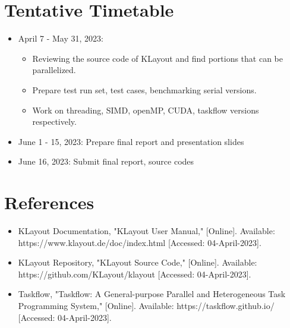 \documentclass[sigconf]{acmart}
\begin{document}
\section{Tentative Timetable}
\begin{itemize}
    \item April 7 - May 31, 2023: 
    \begin{itemize}
      \item Reviewing the source code of KLayout and find portions that can be parallelized.
      \item Prepare test run set, test cases, benchmarking serial versions.
      \item Work on threading, SIMD, openMP, CUDA, taskflow versions respectively.
    \end{itemize}
    \item June 1 - 15, 2023: Prepare final report and presentation slides
    \item June 16, 2023: Submit final report, source codes
\end{itemize}

\section{References}
\begin{itemize}
  \item KLayout Documentation, "KLayout User Manual," [Online]. Available: https://www.klayout.de/doc/index.html [Accessed: 04-April-2023].
  \item KLayout Repository, "KLayout Source Code," [Online]. Available: https://github.com/KLayout/klayout [Accessed: 04-April-2023].
  \item Taskflow, "Taskflow: A General-purpose Parallel and Heterogeneous Task Programming System," [Online]. Available: https://taskflow.github.io/ [Accessed: 04-April-2023].
\end{itemize}
\end{document}
